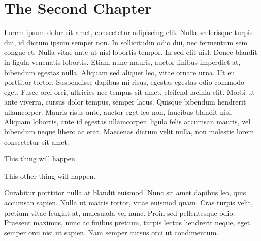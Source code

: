 \chapter{The Second Chapter} \label{ch:2}


Lorem ipsum dolor sit amet, consectetur adipiscing elit. Nulla scelerisque turpis dui, id dictum ipsum semper non. In sollicitudin odio dui, nec fermentum sem congue et. Nulla vitae ante ut nisl lobortis tempor. In sed elit nisl. Donec blandit in ligula venenatis lobortis. Etiam nunc mauris, auctor finibus imperdiet at, bibendum egestas nulla. Aliquam sed aliquet leo, vitae ornare urna. Ut eu porttitor tortor. Suspendisse dapibus mi risus, egestas egestas odio commodo eget. Fusce orci orci, ultricies nec tempus sit amet, eleifend lacinia elit. Morbi ut ante viverra, cursus dolor tempus, semper lacus. Quisque bibendum hendrerit ullamcorper. Mauris risus ante, auctor eget leo non, faucibus blandit nisi. Aliquam lobortis, ante id egestas ullamcorper, ligula felis accumsan mauris, vel bibendum neque libero ac erat. Maecenas dictum velit nulla, non molestie lorem consectetur sit amet. 

\begin{hyp} \label{hyp:3a}
	This thing will happen.
\end{hyp}

\begin{hyp} \label{hyp:3b}
	This other thing will happen.
\end{hyp} 	


Curabitur porttitor nulla at blandit euismod. Nunc sit amet dapibus leo, quis accumsan sapien. Nulla ut mattis tortor, vitae euismod quam. Cras turpis velit, pretium vitae feugiat at, malesuada vel nunc. Proin sed pellentesque odio. Praesent maximus, nunc ac finibus pretium, turpis lectus hendrerit neque, eget semper orci nisi ut sapien. Nam semper cursus orci ut condimentum. 

